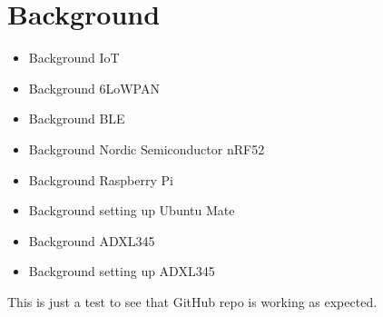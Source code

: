 \chapter{Background}
\label{chp:background} 

\begin{itemize}
  \item Background IoT
  \item Background 6LoWPAN
  \item Background BLE
  \item Background Nordic Semiconductor nRF52
  \item Background Raspberry Pi
  \item Background setting up Ubuntu Mate
  \item Background ADXL345
  \item Background setting up ADXL345
\end{itemize}


This is just a test to see that GitHub repo is working as expected. 